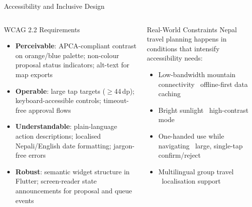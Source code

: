 \documentclass[aspectratio=169,professionalfonts]{beamer}
\newcommand{\hl}[1]{\textbf{\textcolor{ysblue}{#1}}}
\begin{document}
\begin{frame}{Accessibility and Inclusive Design}
  \begin{columns}[T]
    \begin{block}{WCAG 2.2 Requirements}
      \begin{itemize}
        \item \hl{Perceivable}: APCA-compliant contrast on orange/blue palette;
              non-colour proposal status indicators; alt-text for map exports
        \item \hl{Operable}: large tap targets ($\geq$44\,dp);
              keyboard-accessible controls; timeout-free approval flows
        \item \hl{Understandable}: plain-language action descriptions;
              localised Nepali/English date formatting; jargon-free errors
        \item \hl{Robust}: semantic widget structure in Flutter;
              screen-reader state announcements for proposal and queue events
      \end{itemize}
    \end{block}

    \begin{alertblock}{Real-World Constraints}
      Nepal travel planning happens in conditions that intensify accessibility needs:
      \begin{itemize}
        \item Low-bandwidth mountain connectivity \textrightarrow\ offline-first
              data caching
        \item Bright sunlight \textrightarrow\ high-contrast mode
        \item One-handed use while navigating \textrightarrow\ large, single-tap
              confirm/reject
        \item Multilingual group travel \textrightarrow\ localisation support
      \end{itemize}
    \end{alertblock}
  \end{columns}
\end{frame}
\end{document}
